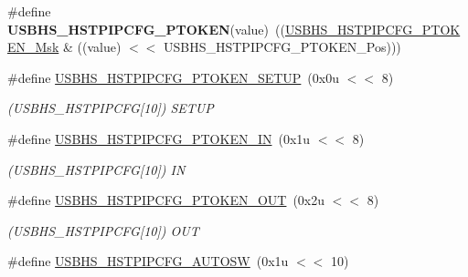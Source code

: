 \begin{DoxyCompactItemize}
\mbox{\label{group__SAME70__USBHS_ga7d1b0be21cfe8f04388bcd96aa50b952}} 
\#define {\bfseries U\+S\+B\+H\+S\+\_\+\+H\+S\+T\+P\+I\+P\+C\+F\+G\+\_\+\+P\+T\+O\+K\+EN}(value)~((\mbox{\hyperlink{group__SAMV71__USBHS_ga9160ad51dac584e665f3ff920817ff34}{U\+S\+B\+H\+S\+\_\+\+H\+S\+T\+P\+I\+P\+C\+F\+G\+\_\+\+P\+T\+O\+K\+E\+N\+\_\+\+Msk}} \& ((value) $<$$<$ U\+S\+B\+H\+S\+\_\+\+H\+S\+T\+P\+I\+P\+C\+F\+G\+\_\+\+P\+T\+O\+K\+E\+N\+\_\+\+Pos)))
\item 
\mbox{\label{group__SAME70__USBHS_ga13977671c7a6080fe0a24e1fa20b55b2}} 
\#define \mbox{\hyperlink{group__SAME70__USBHS_ga13977671c7a6080fe0a24e1fa20b55b2}{U\+S\+B\+H\+S\+\_\+\+H\+S\+T\+P\+I\+P\+C\+F\+G\+\_\+\+P\+T\+O\+K\+E\+N\+\_\+\+S\+E\+T\+UP}}~(0x0u $<$$<$ 8)
\begin{DoxyCompactList}\small\item\em (U\+S\+B\+H\+S\+\_\+\+H\+S\+T\+P\+I\+P\+C\+FG\mbox{[}10\mbox{]}) S\+E\+T\+UP \end{DoxyCompactList}\item 
\mbox{\label{group__SAME70__USBHS_ga05aed341b46e5deb78532b4e66ad3170}} 
\#define \mbox{\hyperlink{group__SAME70__USBHS_ga05aed341b46e5deb78532b4e66ad3170}{U\+S\+B\+H\+S\+\_\+\+H\+S\+T\+P\+I\+P\+C\+F\+G\+\_\+\+P\+T\+O\+K\+E\+N\+\_\+\+IN}}~(0x1u $<$$<$ 8)
\begin{DoxyCompactList}\small\item\em (U\+S\+B\+H\+S\+\_\+\+H\+S\+T\+P\+I\+P\+C\+FG\mbox{[}10\mbox{]}) IN \end{DoxyCompactList}\item 
\mbox{\label{group__SAME70__USBHS_ga0c650ad1cdbe06feef020ac64286b834}} 
\#define \mbox{\hyperlink{group__SAME70__USBHS_ga0c650ad1cdbe06feef020ac64286b834}{U\+S\+B\+H\+S\+\_\+\+H\+S\+T\+P\+I\+P\+C\+F\+G\+\_\+\+P\+T\+O\+K\+E\+N\+\_\+\+O\+UT}}~(0x2u $<$$<$ 8)
\begin{DoxyCompactList}\small\item\em (U\+S\+B\+H\+S\+\_\+\+H\+S\+T\+P\+I\+P\+C\+FG\mbox{[}10\mbox{]}) O\+UT \end{DoxyCompactList}\item 
\mbox{\label{group__SAME70__USBHS_ga4c8f6bdfed56e18995257f9d6285e70b}} 
\#define \mbox{\hyperlink{group__SAME70__USBHS_ga4c8f6bdfed56e18995257f9d6285e70b}{U\+S\+B\+H\+S\+\_\+\+H\+S\+T\+P\+I\+P\+C\+F\+G\+\_\+\+A\+U\+T\+O\+SW}}~(0x1u $<$$<$ 10)
$$
\end{DoxyCompactItemize}
